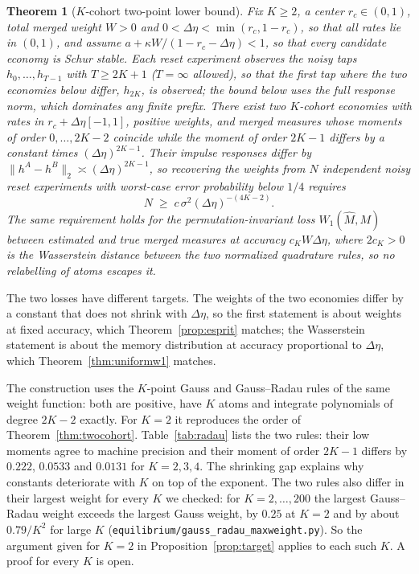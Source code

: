 \documentclass[12pt]{article}
\newtheorem{theorem}{Theorem}[section]
\theoremstyle{definition}
\theoremstyle{remark}
\begin{document}
\begin{theorem}[$K$-cohort two-point lower bound]\label{thm:kcohort}
Fix $K\ge2$, a center $r_c\in(0,1)$, total merged weight $W>0$ and $0<\Delta\eta<\min(r_c,1-r_c)$, so that all rates lie in $(0,1)$, and assume $a+\kappa W/(1-r_c-\Delta\eta)<1$, so that every candidate economy is Schur stable. Each reset experiment observes the noisy taps $h_0,\ldots,h_{T-1}$ with $T\ge2K+1$ ($T=\infty$ allowed), so that the first tap where the two economies below differ, $h_{2K}$, is observed; the bound below uses the full response norm, which dominates any finite prefix. There exist two $K$-cohort economies with rates in $r_c+\Delta\eta[-1,1]$, positive weights, and merged measures whose moments of order $0,\ldots,2K-2$ coincide while the moment of order $2K-1$ differs by a constant times $(\Delta\eta)^{2K-1}$. Their impulse responses differ by $\|h^A-h^B\|_2\asymp(\Delta\eta)^{2K-1}$, so recovering the weights from $N$ independent noisy reset experiments with worst-case error probability below $1/4$ requires
\[
N\;\ge\;c\,\sigma^2(\Delta\eta)^{-(4K-2)} .
\]
The same requirement holds for the permutation-invariant loss $W_1(\hat M,M)$ between estimated and true merged measures at accuracy $c_KW\Delta\eta$, where $2c_K>0$ is the Wasserstein distance between the two normalized quadrature rules, so no relabelling of atoms escapes it.
\end{theorem}

The two losses have different targets. The weights of the two economies differ by a constant that does not shrink with $\Delta\eta$, so the first statement is about weights at fixed accuracy, which Theorem~\ref{prop:esprit} matches; the Wasserstein statement is about the memory distribution at accuracy proportional to $\Delta\eta$, which Theorem~\ref{thm:uniformw1} matches.

The construction uses the $K$-point Gauss and Gauss--Radau rules of the same weight function: both are positive, have $K$ atoms and integrate polynomials of degree $2K-2$ exactly. For $K=2$ it reproduces the order of Theorem~\ref{thm:twocohort}. Table~\ref{tab:radau} lists the two rules: their low moments agree to machine precision and their moment of order $2K-1$ differs by $0.222$, $0.0533$ and $0.0131$ for $K=2,3,4$. The shrinking gap explains why constants deteriorate with $K$ on top of the exponent. The two rules also differ in their largest weight for every $K$ we checked: for $K=2,\ldots,200$ the largest Gauss--Radau weight exceeds the largest Gauss weight, by $0.25$ at $K=2$ and by about $0.79/K^2$ for large $K$ (\nolinkurl{equilibrium/gauss_radau_maxweight.py}). So the argument given for $K=2$ in Proposition~\ref{prop:target} applies to each such $K$. A proof for every $K$ is open.
\end{document}
